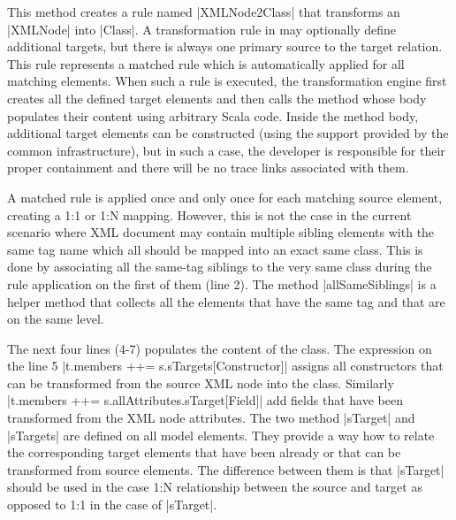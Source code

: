 This method creates a rule named \Scala|XMLNode2Class| that transforms an \Scala|XMLNode| into \Scala|Class|.
A transformation rule in \SIGMA may optionally define additional targets, but there is always one primary source to the target relation.
This rule represents a matched rule which is automatically applied for all matching elements.
When such a rule is executed, the transformation engine first creates all the defined target elements and then calls the method whose body populates their content using arbitrary Scala code.
Inside the method body, additional target elements can be constructed (using the support provided by the common infrastructure), but in such a case, the developer is responsible for their proper containment and there will be no trace links associated with them.

A matched rule is applied once and only once for each matching source element, creating a 1:1 or 1:N mapping.
However, this is not the case in the current scenario where XML document may contain multiple sibling elements with the same tag name which all should be mapped into an exact same class.
This is done by associating all the same-tag siblings to the very same class during the rule application on the first of them (line 2).
The method \Scala|allSameSiblings| is a helper method that collects all the elements that have the same tag and that are on the same level.

The next four lines (4-7) populates the content of the class.
The expression on the line 5 \Scala|t.members ++= s.sTargets[Constructor]| assigns all constructors that can be transformed from the source XML node into the class.
Similarly \Scala|t.members ++= s.allAttributes.sTarget[Field]| add fields that have been transformed from the XML node attributes.
The two method \Scala|sTarget| and \Scala|sTargets| are defined on all model elements.
They provide a way how to relate the corresponding target elements that have been already or that can be transformed from source elements.
The difference between them is that \Scala|sTarget| should be used in the case 1:N relationship between the source and target as opposed to 1:1 in the case of \Scala|sTarget|.

